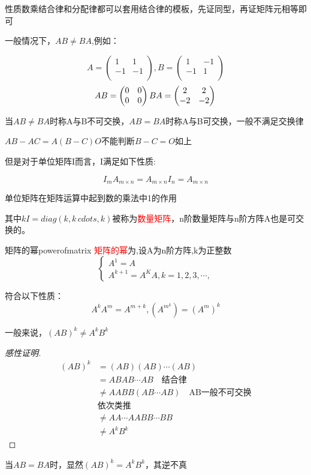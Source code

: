 性质数乘结合律和分配律都可以套用结合律的模板，先证同型，再证矩阵元相等即可

一般情况下，$AB\neq BA$,例如：

$$
A=\begin{pmatrix}
	1&1\\-1&-1\\
\end{pmatrix},
B=\begin{pmatrix}
	1&-1\\-1&1\\
\end{pmatrix}
$$
$$
AB=\begin{pmatrix}
0&0\\0&0\\
\end{pmatrix}\\
BA=\begin{pmatrix}
	2&2\\-2&-2\\
\end{pmatrix}\\
$$

当$AB\neq BA$时称A与B不可交换，$AB=BA$时称A与B可交换，一般不满足交换律

\begin{note}
	$AB-AC=A(B-C)O$不能判断$B-C=O$如上
\end{note}

但是对于单位矩阵I而言，I满足如下性质:

$$
I_{m}A_{m\times n}=A_{m\times n}I_n=A_{m\times n}
$$

单位矩阵在矩阵运算中起到数的乘法中1的作用

其中$kI=diag(k,k\,cdots,k)$被称为\textcolor{red}{数量矩阵}，n阶数量矩阵与n阶方阵A也是可交换的。

\begin{definition}{矩阵的幂}{powerofmatrix}
	\textcolor{red}{矩阵的幂}为,设A为n阶方阵,k为正整数
	$$
	\begin{cases}
		A^1=A\\
		A^{k+1}=A^KA,k=1,2,3,\cdots,
	\end{cases}
	$$

	符合以下性质：
	$$
	A^kA^m=A^{m+k},(A^{m^k})=(A^m)^k
	$$
\end{definition}

\begin{example}
	一般来说，$(AB)^k\neq A^kB^k$

	\begin{proof}[感性证明]
	$$
	\begin{aligned}
			(AB)^k&=(AB)(AB)\cdots(AB)\\
			&=ABAB\cdots AB\quad \mbox{结合律}\\
			&\neq AABB(AB\cdots AB) \quad \mbox{AB一般不可交换}\\
			&\mbox{依次类推}\\
			&\neq{AA\cdots AABB\cdots BB}\\
			&\neq A^kB^k
	\end{aligned}
	$$
	\end{proof}

	当$AB=BA$时，显然$(AB)^k= A^kB^k$，其逆不真
\end{example}

